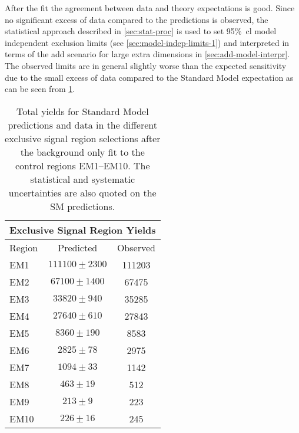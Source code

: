 After the fit the agreement between data and theory expectations is good. Since
no significant excess of data compared to the predictions is observed, the
statistical approach described in \cref{sec:stat-proc} is used to set
95\%~\gls{cl} model independent exclusion limits (see
\cref{sec:model-indep-limits-1}) and interpreted in terms of the \gls{add}
scenario for large extra dimensions in \cref{sec:add-model-interpr}. The
observed limits are in general slightly worse than the expected sensitivity due
to the small excess of data compared to the Standard Model expectation as can be
seen from \cref{tab:sr_yields}.
\begin{table}[!htb]
  \centering
  \begin{tabular}{lcc}
    \toprule
    \multicolumn{3}{c}{Exclusive Signal Region Yields} \\
    \midrule \midrule
    Region & Predicted & Observed \\
    \midrule
    EM1 & $111100 \pm 2300$ & 111203 \\
    EM2 & $67100 \pm 1400$ & 67475 \\
    EM3 & $33820 \pm 940$ & 35285 \\
    EM4 & $27640 \pm 610$ & 27843 \\
    EM5 & $8360 \pm 190$ & 8583 \\
    EM6 & $2825 \pm 78$ & 2975 \\
    EM7 & $1094 \pm 33$ & 1142 \\
    EM8 & $463 \pm 19$ & 512 \\
    EM9 & $213 \pm 9$ & 223 \\
    EM10 & $226 \pm 16$ & 245 \\
    \bottomrule
  \end{tabular}
  \caption{Total yields for Standard Model predictions and data in the different
    exclusive signal region selections after the background only fit to the
    control regions EM1--EM10. The statistical and systematic uncertainties are
    also quoted on the SM predictions.}
  \label{tab:sr_yields}
\end{table}
